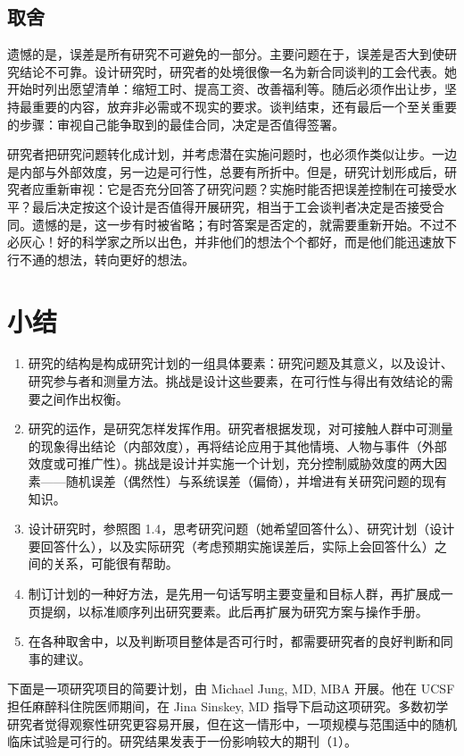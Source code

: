 \subsection{取舍}
遗憾的是，误差是所有研究不可避免的一部分。主要问题在于，误差是否大到使研究结论不可靠。设计研究时，研究者的处境很像一名为新合同谈判的工会代表。她开始时列出愿望清单：缩短工时、提高工资、改善福利等。随后必须作出让步，坚持最重要的内容，放弃非必需或不现实的要求。谈判结束，还有最后一个至关重要的步骤：审视自己能争取到的最佳合同，决定是否值得签署。

研究者把研究问题转化成计划，并考虑潜在实施问题时，也必须作类似让步。一边是内部与外部效度，另一边是可行性，总要有所折中。但是，研究计划形成后，研究者应重新审视：它是否充分回答了研究问题？实施时能否把误差控制在可接受水平？最后决定按这个设计是否值得开展研究，相当于工会谈判者决定是否接受合同。遗憾的是，这一步有时被省略；有时答案是否定的，就需要重新开始。不过不必灰心！好的科学家之所以出色，并非他们的想法个个都好，而是他们能迅速放下行不通的想法，转向更好的想法。

\section{小结}
\begin{enumerate}
\item 研究的结构是构成研究计划的一组具体要素：研究问题及其意义，以及设计、研究参与者和测量方法。挑战是设计这些要素，在可行性与得出有效结论的需要之间作出权衡。
\item 研究的运作，是研究怎样发挥作用。研究者根据发现，对可接触人群中可测量的现象得出结论（内部效度），再将结论应用于其他情境、人物与事件（外部效度或可推广性）。挑战是设计并实施一个计划，充分控制威胁效度的两大因素——随机误差（偶然性）与系统误差（偏倚），并增进有关研究问题的现有知识。
\item 设计研究时，参照图 1.4，思考研究问题（她希望回答什么）、研究计划（设计要回答什么），以及实际研究（考虑预期实施误差后，实际上会回答什么）之间的关系，可能很有帮助。
\item 制订计划的一种好方法，是先用一句话写明主要变量和目标人群，再扩展成一页提纲，以标准顺序列出研究要素。此后再扩展为研究方案与操作手册。
\item 在各种取舍中，以及判断项目整体是否可行时，都需要研究者的良好判断和同事的建议。
\end{enumerate}

下面是一项研究项目的简要计划，由 Michael Jung, MD, MBA 开展。他在 UCSF 担任麻醉科住院医师期间，在 Jina Sinskey, MD 指导下启动这项研究。多数初学研究者觉得观察性研究更容易开展，但在这一情形中，一项规模与范围适中的随机临床试验是可行的。研究结果发表于一份影响较大的期刊（1）。

